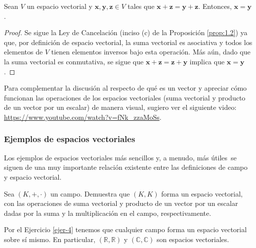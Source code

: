 \documentclass[apuntes]{subfiles}
\begin{document}
\begin{Coro}\label{coro:1.6}
Sean $V$ un espacio vectorial y $\mathbf{x},\mathbf{y},\mathbf{z}\in V$ tales que $\mathbf{x}+\mathbf{z}=\mathbf{y}+\mathbf{z}$. Entonces, $\mathbf{x}=\mathbf{y}$.

\begin{proof}

    Se sigue la Ley de Cancelación (inciso (c) de la Proposición \ref{prop:1.2}) ya que, por definición de espacio vectorial, la suma vectorial es asociativa y todos los elementos de $V$ tienen elementos inversos bajo esta operación. Más aún, dado que la suma vectorial es conmutativa, se sigue que $\mathbf{x}+\mathbf{z} = \mathbf{z}+\mathbf{y}$ implica que $\mathbf{x}=\mathbf{y}$.
\end{proof}
\end{Coro}

Para complementar la discusión al respecto de qué es un vector y apreciar cómo funcionan las operaciones de los espacios vectoriales (suma vectorial y producto de un vector por un escalar) de manera visual, sugiero ver el siguiente video: \url{https://www.youtube.com/watch?v=fNk_zzaMoSs}.

\subsubsection*{Ejemplos de espacios vectoriales} \label{Ejem:Espacios_vectoriales}

Los ejemplos de espacios vectoriales más sencillos \textemdash y, a menudo, más útiles\textemdash \ se siguen de una muy importante relación existente entre las definiciones de campo y espacio vectorial.

\begin{ejer}\label{ejer-4}
    
    Sea $(K,+,\cdot)$ un campo. Demuestra que $(K,K)$ forma un espacio vectorial, con las operaciones de suma vectorial y producto de un vector por un escalar dadas por la suma y la multiplicación en el campo, respectivamente.
\end{ejer}

Por el Ejercicio \ref{ejer-4} tenemos que cualquier campo forma un espacio vectorial sobre sí mismo. En particular, $(\mathbb{R},\mathbb{R})$ y $(\mathbb{C},\mathbb{C})$ son espacios vectoriales. \\ %

%    
\end{document}
